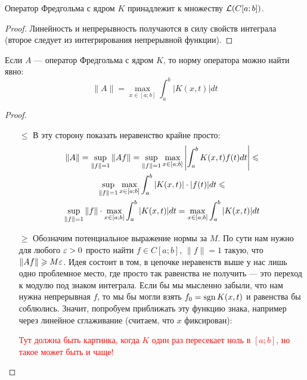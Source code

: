 \begin{proposition}
	Оператор Фредгольма с ядром $K$ принадлежит к множеству $\mathcal{L}(C[a; b])$.
\end{proposition}

\begin{proof}
	Линейность и непрерывность получаются в силу свойств интеграла (второе следует из интегрирования непрерывной функции).
\end{proof}

\begin{proposition}
	Если $A$ --- оператор Фредгольма с ядром $K$, то норму оператора можно найти явно:
	\[
		\|A\| = \max_{x \in [a; b]} \int_a^b |K(x, t)|dt
	\]
\end{proposition}

\begin{proof}~
	\begin{itemize}
		\item[$\le$] В эту сторону показать неравенство крайне просто:
		\begin{multline*}
			\|A\| = \sup_{\|f\| = 1} \|Af\| = \sup_{\|f\| = 1} \max_{x \in [a; b]} \left|\int_a^b K(x, t)f(t)dt\right| \leqslant
			\\
			\sup_{\|f\| = 1} \max_{x \in [a; b]} \int_a^b |K(x, t)| \cdot |f(t)|dt \leqslant
			\\
			\sup_{\|f\| = 1} \|f\| \cdot \max_{x \in [a; b]} \int_a^b |K(x, t)|dt = \max_{x \in [a; b]} \int_a^b |K(x, t)|dt
		\end{multline*}
		
		\item[$\ge$] Обозначим потенциальное выражение нормы за $M$. По сути нам нужно для любого $\varepsilon > 0$ просто найти $f \in C[a; b]$, $\|f\| = 1$ такую, что $\|Af\| \geqslant M\varepsilon$. Идея состоит в том, в цепочке неравенств выше у нас лишь одно проблемное место, где просто так равенства не получить --- это переход к модулю под знаком интеграла. Если бы мы мысленно забыли, что нам нужна непрерывная $f$, то мы бы могли взять $f_0 = \operatorname{sgn} K(x, t)$ и равенства бы соблюлись. Значит, попробуем приближать эту функцию знака, например через линейное сглаживание (считаем, что $x$ фиксирован):
		
		\textcolor{red}{Тут должна быть картинка, когда $K$ один раз пересекает ноль в $[a; b]$, но такое может быть и чаще!}
		

\end{itemize}
\end{proof}
